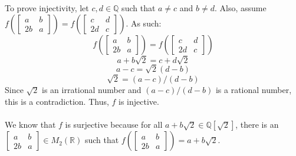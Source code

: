 \documentclass{article}
\begin{document}
\begin{enumerate}
To prove injectivity, let $c, d \in \mathbb{Q}$ such that $a \neq c$ and $b \neq d$.
Also, assume $f(\begin{bmatrix} a & b \\ 2b & a \end{bmatrix}) = f(\begin{bmatrix} c & d \\ 2d & c \end{bmatrix})$.
As such:
\[
f(\begin{bmatrix} a & b \\ 2b & a \end{bmatrix}) = f(\begin{bmatrix} c & d \\ 2d & c \end{bmatrix})
\] \[
a + b\sqrt2 = c + d\sqrt2
\] \[
a - c = \sqrt{2}(d - b)
\] \[
\sqrt2 = (a - c)/(d - b)
\]
Since $\sqrt2$ is an irrational number and $(a-c)/(d-b)$ is a rational number,
this is a contradiction.  Thus, $f$ is injective. \\ \\
We know that $f$ is surjective because for all $a+b\sqrt2 \in \mathbb{Q}[\sqrt2]$,
there is an $\begin{bmatrix} a & b \\ 2b & a \end{bmatrix} \in M_2(\mathbb{R})$ such that
$f(\begin{bmatrix} a & b \\ 2b & a \end{bmatrix}) = a+b\sqrt2$. \\ \\


\end{enumerate}
\end{document}
